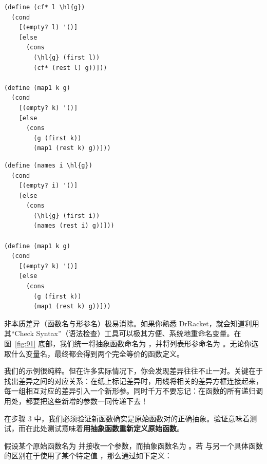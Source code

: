 \begin{center}
  \begin{stepperbox}[unbreakable]
    \noindent\begin{minipage}[t]{0.48\linewidth}\vspace{0pt}
\begin{Verbatim}[commandchars=\\\{\}, fontsize=\fontsize{6.0pt}{7.2pt}\selectfont]
(define (cf* l \hl{g})
  (cond
    [(empty? l) '()]
    [else
      (cons
        (\hl{g} (first l))
        (cf* (rest l) g))]))

(define (map1 k g)
  (cond
    [(empty? k) '()]
    [else
      (cons
        (g (first k))
        (map1 (rest k) g))]))
\end{Verbatim}
    \end{minipage}\hfill
    \begin{minipage}[t]{0.48\linewidth}\vspace{0pt}
\begin{Verbatim}[commandchars=\\\{\}, fontsize=\fontsize{6.0pt}{7.2pt}\selectfont]
(define (names i \hl{g})
  (cond
    [(empty? i) '()]
    [else
      (cons
        (\hl{g} (first i))
        (names (rest i) g))]))

(define (map1 k g)
  (cond
    [(empty? k) '()]
    [else
      (cons
        (g (first k))
        (map1 (rest k) g))]))
\end{Verbatim}
    \end{minipage}
  \end{stepperbox}
  \label{fig:91}
\end{center}

非本质差异（函数名与形参名）极易消除。如果你熟悉 DrRacket，就会知道利用其“Check Syntax”（语法检查）工具可以极其方便、系统地重命名变量。在图~\ref{fig:91} 底部，我们统一将抽象函数命名为 ，并将列表形参命名为 。无论你选取什么变量名，最终都会得到两个完全等价的函数定义。

我们的示例很纯粹。但在许多实际情况下，你会发现差异往往不止一对。关键在于找出差异之间的对应关系：在纸上标记差异时，用线将相关的差异方框连接起来，每一组相互对应的差异引入一个新形参。同时千万不要忘记：在函数的所有递归调用处，都要把这些新增的参数一同传递下去！

在步骤 3 中，我们必须验证新函数确实是原始函数对的正确抽象。验证意味着测试，而在此处测试意味着\textbf{用抽象函数重新定义原始函数}。

假设某个原始函数名为  并接收一个参数，而抽象函数名为 。若  与另一个具体函数的区别在于使用了某个特定值 ，那么通过如下定义：

